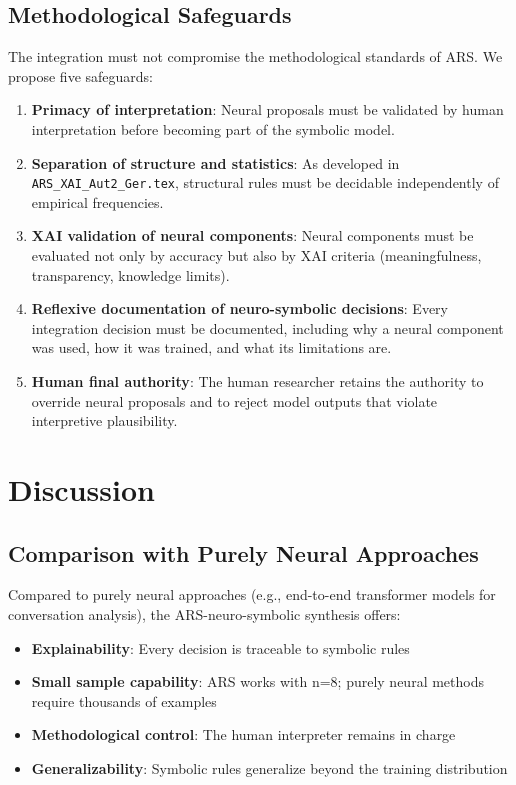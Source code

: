 \documentclass[12pt,a4paper]{article}
\begin{document}
\subsection{Methodological Safeguards}

The integration must not compromise the methodological standards of ARS. 
We propose five safeguards:

\begin{enumerate}
    \item \textbf{Primacy of interpretation}: Neural proposals must be validated 
    by human interpretation before becoming part of the symbolic model.
    
    \item \textbf{Separation of structure and statistics}: As developed in 
    \texttt{ARS\_XAI\_Aut2\_Ger.tex}, structural rules must be decidable 
    independently of empirical frequencies.
    
    \item \textbf{XAI validation of neural components}: Neural components must 
    be evaluated not only by accuracy but also by XAI criteria (meaningfulness, 
    transparency, knowledge limits).
    
    \item \textbf{Reflexive documentation of neuro-symbolic decisions}: Every 
    integration decision must be documented, including why a neural component 
    was used, how it was trained, and what its limitations are.
    
    \item \textbf{Human final authority}: The human researcher retains the 
    authority to override neural proposals and to reject model outputs that 
    violate interpretive plausibility.
\end{enumerate}

\section{Discussion}

\subsection{Comparison with Purely Neural Approaches}

Compared to purely neural approaches (e.g., end-to-end transformer models for 
conversation analysis), the ARS-neuro-symbolic synthesis offers:

\begin{itemize}
    \item \textbf{Explainability}: Every decision is traceable to symbolic rules
    \item \textbf{Small sample capability}: ARS works with n=8; purely neural 
    methods require thousands of examples
    \item \textbf{Methodological control}: The human interpreter remains in charge
    \item \textbf{Generalizability}: Symbolic rules generalize beyond the training 
    distribution
\end{itemize}
\end{document}
